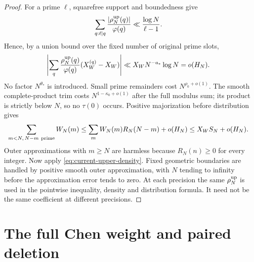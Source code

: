\begin{proof}
For a prime $\ell$, squarefree support and boundedness give
\[
 \sum_{q:\ell\mid q}\frac{|\rho_N^{\rm up}(q)|}{\varphi(q)}
       \ll\frac{\log N}{\ell-1}.
\]
Hence, by a union bound over the fixed number of original prime slots,
\begin{equation}
 \left|\sum_q\frac{\rho_N^{\rm up}(q)}{\varphi(q)}
                         (X_W^{(q)}-X_W)\right|
       \ll X_WN^{-a_*}\log N=o(H_N).
 \label{eq:current-coprime-correction}
\end{equation}
No factor $N^{\theta_*}$ is introduced.  Small prime remainders cost
$N^{\rho_0+o(1)}$.  The smooth complete-product trim costs
$N^{1-\kappa_0+o(1)}$ after the full modulus sum; its product is
strictly below $N$, so no $\tau(0)$ occurs.  Positive majorization
before distribution gives
\[
 \sum_{m<N,\,N-m\ {\rm prime}}W_N(m)
 \le\sum_m W_N(m)R_N(N-m)+o(H_N)
 \le X_WS_N+o(H_N).
\]
Outer approximations with $m\ge N$ are harmless because
$R_N(n)\ge0$ for every integer.  Now apply
\eqref{eq:current-upper-density}.  Fixed geometric boundaries are
handled by positive smooth outer approximation, with $N$ tending to
infinity before the approximation error tends to zero.  At each
precision the same $\rho_N^{\rm up}$ is used in the pointwise inequality,
density and distribution formula.  It need not be the same
coefficient at different precisions.
\end{proof}

\section{The full Chen weight and paired deletion}
\label{sec:current-chen-weight}

